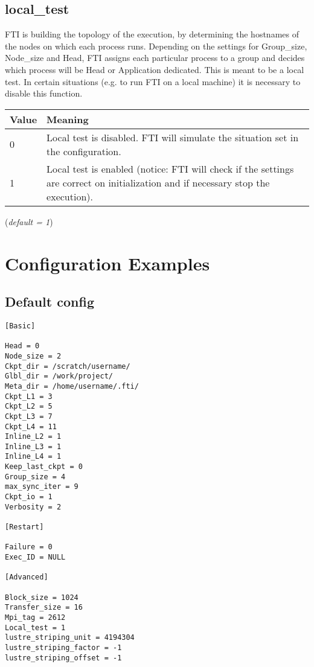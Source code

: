 \documentclass{refrep}
\begin{document}
\subsection{local\_test}\label{subsec:localtest}
FTI is building the topology of the execution, by determining the hostnames of the nodes on which each process runs. Depending on the settings for Group\_size, Node\_size and Head, FTI assigns each particular process to a group and decides which process will be Head or Application dedicated. This is meant to be a local test. In certain situations (e.g. to run FTI on a local machine) it is necessary to disable this function.
\begin{center}
\begin{tabular}[h!]{|p{}|p{}|}
\hline
\textbf{Value} & \textbf{Meaning} \\ \hline
0 & Local test is disabled. FTI will simulate the situation set in the configuration. \\ \hline
1 & Local test is enabled (notice: FTI will check if the settings are correct on initialization and if necessary stop the execution). \\ \hline
\end{tabular}
\end{center}
(\textit{default = 1})
\newpage
\section{Configuration Examples}\label{sec:configurationexamples}
\subsection{Default config}\label{subsec:configdefault}
\begin{center}
\begin{lstlisting}[frame=single]
[Basic]

Head = 0
Node_size = 2
Ckpt_dir = /scratch/username/
Glbl_dir = /work/project/
Meta_dir = /home/username/.fti/
Ckpt_L1 = 3
Ckpt_L2 = 5
Ckpt_L3 = 7
Ckpt_L4 = 11
Inline_L2 = 1
Inline_L3 = 1
Inline_L4 = 1
Keep_last_ckpt = 0
Group_size = 4
max_sync_iter = 9
Ckpt_io = 1
Verbosity = 2

[Restart]

Failure = 0
Exec_ID = NULL

[Advanced]

Block_size = 1024
Transfer_size = 16
Mpi_tag = 2612
Local_test = 1
lustre_striping_unit = 4194304 
lustre_striping_factor = -1 
lustre_striping_offset = -1 

\end{lstlisting}
\end{center}
\end{document}
